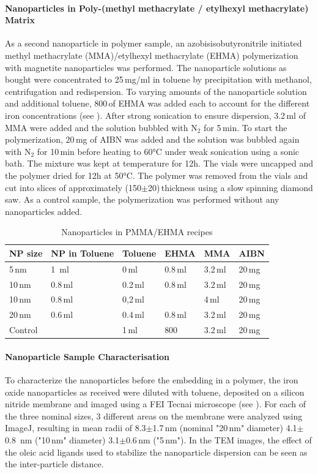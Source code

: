 \paragraph{Nanoparticles in Poly-(methyl methacrylate / etylhexyl methacrylate)  Matrix}
As a second nanoparticle in polymer sample, an azobisisobutyronitrile initiated methyl methacrylate (MMA)/etylhexyl methacrylate (EHMA) polymerization with magnetite nanoparticles was performed. 
The nanoparticle solutions as bought were concentrated to 25\,mg/ml in toluene by precipitation with methanol, centrifugation and redispersion.  To varying amounts of the nanoparticle solution and additional toluene, 800\,\microliter of EHMA was added each to account for the different iron concentrations (see ). After strong sonication to ensure dispersion, 3.2\,ml of MMA were added and the solution  bubbled with N$_2$ for 5\,min. To start the polymerization, 20\,mg of AIBN was added and the solution was bubbled again with N$_2$  for 10\,min before heating to 60°C under weak sonication using a sonic bath. The mixture was kept at temperature for 12h.
The vials were uncapped and the polymer dried for 12h at 50°C. The polymer was removed from the vials and cut into slices of approximately (150$\pm$20)\,\micrometer thickness using a slow spinning diamond saw.
As a control sample, the polymerization was performed without any nanoparticles added.

\begin{table}[tp]
	\centering
	\caption{Nanoparticles in PMMA/EHMA recipes}
	\label{tab:sampleCP}
	\begin{tabular}{llllll}
		\hline
		NP size &NP in Toluene&Toluene & EHMA & MMA & AIBN \\
		\hline
		5\,nm&1 \,ml & 0\,ml&0.8\,ml&  3.2\,ml&   20\,mg    \\
		10\,nm& 0.8\,ml& 0.2\,ml & 0.8\,ml&  3.2\,ml&   20\,mg    \\
		10\,nm& 0.8\,ml& 0,2\,ml &            &  4\,ml   &   20\,mg    \\
		20\,nm& 0.6\,ml& 0.4\,ml& 0.8\,ml&  3.2\,ml&   20\,mg    \\
		Control&           & 1\,ml     &800\,\microliter&  3.2\,ml&   20\,mg    \\
		\hline
	\end{tabular}
\end{table}

\paragraph{Nanoparticle Sample Characterisation}
To characterize the nanoparticles before the embedding in a polymer, the iron oxide nanoparticles as received were diluted with toluene, deposited on a silicon nitride membrane and imaged using a FEI Tecnai microscope  (see ).  For each of the three nominal sizes, 3 different areas on the membrane were analyzed using ImageJ, resulting in mean radii of 8.3$\pm$1.7\,nm (nominal "20\,nm" diameter) 4.1$\pm$0.8 \,nm	("10\,nm" diameter) 3.1$\pm$0.6\,nm ("5\,nm"). In the TEM images, the effect of the oleic acid ligands used to stabilize the nanoparticle dispersion can be seen as the inter-particle distance.

